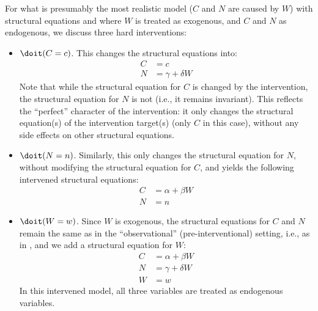 For what is presumably the most realistic model ($C$ and $N$ are caused by $W$) with structural equations
 and where $W$ is treated as exogenous, and $C$ and $N$ as endogenous, we discuss three hard interventions:
\begin{itemize}
  \item $\doit(C=c)$. This changes the structural equations into:
    \begin{align}\label{eq:scm_W_causes_C_and_N_do_C}
      C &= c \\
      N &= \gamma + \delta W
    \end{align} 
    Note that while the structural equation for $C$ is changed by the intervention, the structural equation for $N$ is not (i.e., it remains invariant). This reflects the ``perfect'' character of the intervention: it only changes the structural equation(s) of the intervention target(s) (only $C$ in this case), without any side effects on other structural equations.
  \item $\doit(N=n)$. Similarly, this only changes the structural equation for $N$, without modifying the structural equation for $C$, and yields the following intervened structural equations:
    \begin{align}\label{eq:scm_W_causes_C_and_N_do_N}
      C &= \alpha + \beta W \\
      N &= n
    \end{align} 
  \item $\doit(W=w)$. Since $W$ is exogenous, the structural equations for $C$ and $N$ remain the same as in the ``observational'' (pre-interventional) setting, i.e., as in , and we add a structural equation for $W$:
    \begin{align*}
      C &= \alpha + \beta W \\
      N &= \gamma + \delta W \\
      W &= w
    \end{align*}
  In this intervened model, all three variables are treated as endogenous variables.
\end{itemize}


